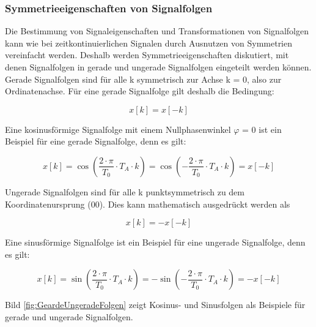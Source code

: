\subsubsection{Symmetrieeigenschaften von Signalfolgen}

\noindent Die Bestimmung von Signaleigenschaften und Transformationen von Signalfolgen kann wie bei zeitkontinuierlichen Signalen durch Ausnutzen von Symmetrien vereinfacht werden. Deshalb werden Symmetrieeigenschaften diskutiert, mit denen Signalfolgen in gerade und ungerade Signalfolgen eingeteilt werden k\"{o}nnen. Gerade Signalfolgen sind f\"{u}r alle k symmetrisch zur Achse k = 0, also zur Ordinatenachse. F\"{u}r eine gerade Signalfolge gilt deshalb die Bedingung:

\begin{equation}\label{eq:threeeleven}
x\left[k\right]=x\left[-k\right]
\end{equation}

\noindent Eine kosinusf\"{o}rmige Signalfolge mit einem Nullphasenwinkel $\varphi$ = 0 ist ein Beispiel f\"{u}r eine gerade Signalfolge, denn es gilt:

\begin{equation}\label{eq:threetwelve}
x\left[k\right]=\cos \left(\frac{2\cdot \pi }{T_{0} } \cdot T_{A} \cdot k\right)=\cos \left(-\frac{2\cdot \pi }{T_{0} } \cdot T_{A} \cdot k\right)=x\left[-k\right]
\end{equation}

\noindent Ungerade Signalfolgen sind f\"{u}r alle k punktsymmetrisch zu dem Koordinatenursprung (0{\textbar}0). Dies kann mathematisch ausgedr\"{u}ckt werden als

\begin{equation}\label{eq:threethirteen}
x\left[k\right]=-x\left[-k\right]
\end{equation}

\clearpage

\noindent Eine sinusf\"{o}rmige Signalfolge ist ein Beispiel f\"{u}r eine ungerade Signalfolge, denn es gilt:

\begin{equation}\label{eq:threefourteen}
x\left[k\right]=\sin \left(\frac{2\cdot \pi }{T_{0} } \cdot T_{A} \cdot k\right)=-\sin \left(-\frac{2\cdot \pi }{T_{0} } \cdot T_{A} \cdot k\right)=-x\left[-k\right]
\end{equation}

\noindent Bild \ref{fig:GeardeUngeradeFolgen}  zeigt Kosinus- und Sinusfolgen als Beispiele f\"{u}r gerade und ungerade Signalfolgen. 

